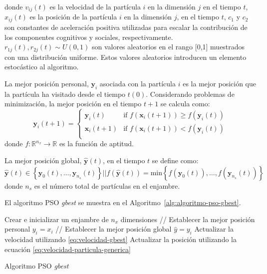 \documentclass{article}
\begin{document}
donde $v_{ij}(t)$ es la velocidad de la partícula $i$ en la dimensión $j$ en el tiempo $t$, $x_{ij}(t)$ es la posición de la partícula $i$ en la dimensión $j$, en el tiempo $t$, $c_1$ y $c_2$ son constantes de aceleración positiva utilizadas para escalar la contribución de los componentes cognitivos y sociales, respectivamente.
$r_{1j}(t), r_{2j}(t) \sim U(0,1)$ son valores aleatorios en el rango [0,1] muestrados con una distribución uniforme.
Estos valores aleatorios introducen un elemento estocástico al algoritmo.

La mejor posición personal, $\mathbf{y}_i$ asociada con la partícula $i$ es la mejor posición que la partícula ha visitado desde el tiempo $t(0)$.
Considerando problemas de minimización, la mejor posición en el tiempo $t+1$ se calcula como:
\begin{equation}
\mathbf{y}_i(t+1) = \begin{cases}
               \mathbf{y}_i(t)	& \text{if } f(\mathbf{x}_i(t+1)) \geq f(\mathbf{y}_i(t))\\
               \mathbf{x}_i(t+1)	& \text{if } f(\mathbf{x}_i(t+1)) < f(\mathbf{y}_i(t))\\
           \end{cases}	
\end{equation}
donde $f: \mathbb{R}^{n_x} \to \mathbb{R}$ es la función de aptitud.

La mejor posición global, $\mathbf{\hat{y}}(t)$, en el tiempo $t$ se define como:
$$
\mathbf{\hat{y}}(t) \in \left \{ \mathbf{y}_0(t), \ldots, \mathbf{y}_{n_s}(t) \right \} | | f(\mathbf{\hat{y}}(t)) = \text{min} \left \{ f(\mathbf{y}_0(t)),\ldots,f(\mathbf{y}_{n_s}(t)) \right \}
$$
donde $n_s$ es el número total de partículas en el enjambre.

El algoritmo PSO \emph{gbest} se muestra en el Algoritmo~\ref{alg:algoritmo-pso-gbest}.

\begin{algorithm} 
\begin{algorithmic}[1] 
\STATE Crear e inicializar un enjambre de $n_x$ dimensiones
\REPEAT
		\STATE // Establecer la mejor posición personal
			\STATE $y_i = x_i$
		\ENDIF
		\STATE // Establecer la mejor posición global 
			\STATE $\hat{y} = y_i$
		\ENDIF
	\ENDFOR
		\STATE Actualizar la velocidad utilizando \ref{eq:velocidad-gbest}
		\STATE Actualizar la posición utilizando la ecuación \ref{eq:velocidad-particula-generica}
	\ENDFOR
{}
\end{algorithmic} 
\caption{Algoritmo PSO \emph{gbest}} 
\label{alg:algoritmo-pso-gbest}
\end{algorithm}
\end{document}
